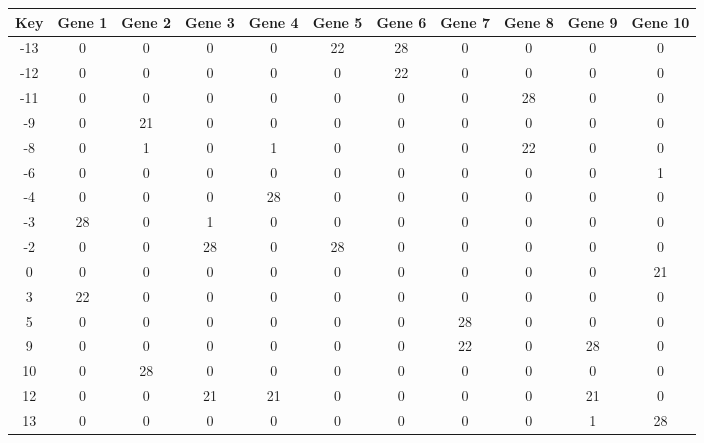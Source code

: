 \begin{tabular}{|c|c|c|c|c|c|c|c|c|c|c|}
\hline
Key & Gene 1 & Gene 2 & Gene 3 & Gene 4 & Gene 5 & Gene 6 & Gene 7 & Gene 8 & Gene 9 & Gene 10 \\
\hline
-13 & 0 & 0 & 0 & 0 & 22 & 28 & 0 & 0 & 0 & 0 \\
-12 & 0 & 0 & 0 & 0 & 0 & 22 & 0 & 0 & 0 & 0 \\
-11 & 0 & 0 & 0 & 0 & 0 & 0 & 0 & 28 & 0 & 0 \\
-9 & 0 & 21 & 0 & 0 & 0 & 0 & 0 & 0 & 0 & 0 \\
-8 & 0 & 1 & 0 & 1 & 0 & 0 & 0 & 22 & 0 & 0 \\
-6 & 0 & 0 & 0 & 0 & 0 & 0 & 0 & 0 & 0 & 1 \\
-4 & 0 & 0 & 0 & 28 & 0 & 0 & 0 & 0 & 0 & 0 \\
-3 & 28 & 0 & 1 & 0 & 0 & 0 & 0 & 0 & 0 & 0 \\
-2 & 0 & 0 & 28 & 0 & 28 & 0 & 0 & 0 & 0 & 0 \\
0 & 0 & 0 & 0 & 0 & 0 & 0 & 0 & 0 & 0 & 21 \\
3 & 22 & 0 & 0 & 0 & 0 & 0 & 0 & 0 & 0 & 0 \\
5 & 0 & 0 & 0 & 0 & 0 & 0 & 28 & 0 & 0 & 0 \\
9 & 0 & 0 & 0 & 0 & 0 & 0 & 22 & 0 & 28 & 0 \\
10 & 0 & 28 & 0 & 0 & 0 & 0 & 0 & 0 & 0 & 0 \\
12 & 0 & 0 & 21 & 21 & 0 & 0 & 0 & 0 & 21 & 0 \\
13 & 0 & 0 & 0 & 0 & 0 & 0 & 0 & 0 & 1 & 28 \\
\hline
\end{tabular}